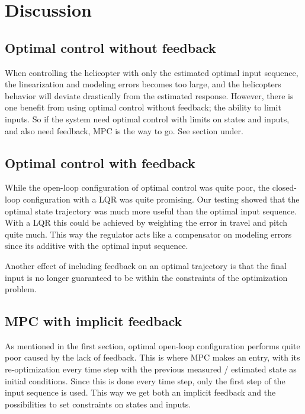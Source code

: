\section{Discussion}\label{sec:discussion}
\subsection{Optimal control without feedback}
When controlling the helicopter with only the estimated optimal input sequence, the linearization and modeling errors becomes too large, and the helicopters behavior will deviate drastically from the estimated response. However, there is one benefit from using optimal control without feedback; the ability to limit inputs. So if the system need optimal control with limits on states and inputs, and also need feedback, MPC is the way to go. See section under.

\subsection{Optimal control with feedback}
While the open-loop configuration of optimal control was quite poor, the closed-loop configuration with a LQR was quite promising. Our testing showed that the optimal state trajectory was much more useful than the optimal input sequence. With a LQR this could be achieved by weighting the error in travel and pitch quite much. This way the regulator acts like a compensator on modeling errors since its additive with the optimal input sequence.

Another effect of including feedback on an optimal trajectory is that the final input is no longer guaranteed to be within the constraints of the optimization problem.

\subsection{MPC with implicit feedback}
As mentioned in the first section, optimal open-loop configuration performs quite poor caused by the lack of feedback. This is where MPC makes an entry, with its re-optimization every time step with the previous measured / estimated state as initial conditions. Since this is done every time step, only the first step of the input sequence is used. This way we get both an implicit feedback and the possibilities to set constraints on states and inputs. 